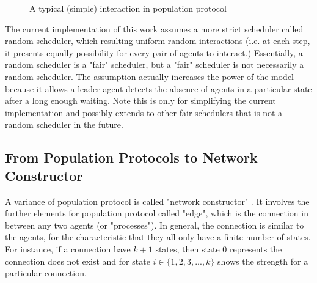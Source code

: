 \begin{figure}[H]
\begin{center}
\end{center}
\caption{A typical (simple) interaction in population protocol}
\end{figure}


\par\noindent
The current implementation of this work assumes a more strict scheduler called random scheduler,
which resulting uniform random interactions (i.e. at each step, it presents
equally possibility for every pair of agents to interact.) Essentially, a random scheduler is a "fair" scheduler, but a "fair" scheduler is not necessarily a random scheduler.
The assumption actually increases the power of the model because it allows a leader agent detects the absence
of agents in a particular state after a long enough waiting. Note this is only for
simplifying the current implementation and possibly extends to other fair schedulers that is not a
random scheduler in the future.

\subsection{From Population Protocols to Network Constructor \cite{MS16a}}
\par\noindent
A variance of population protocol is called "network constructor" \cite{MS16a}.
It involves the further elements for population protocol called "edge", which is
the connection in between any two agents (or "processes"). In general, the connection
is similar to the agents, for the characteristic that they all only have a finite number of states. For instance, if
a connection have $k + 1$ states, then state 0 represents the connection does not exist and for state $i \in \{1,2,3, ..., k\}$
shows the strength for a particular connection.


